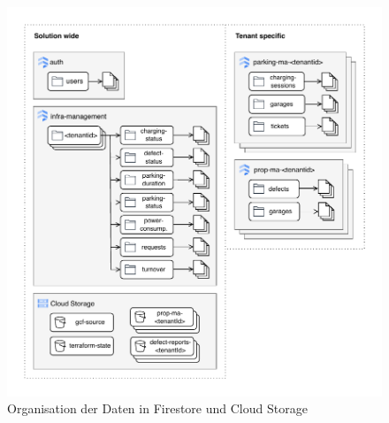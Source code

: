 \begin{figure}[ht]
    \centering
    \includegraphics[width=\textwidth]{resources/data-model.drawio.pdf}
    \caption{Organisation der Daten in Firestore und Cloud Storage}
    \label{fig:data-model}
\end{figure}

